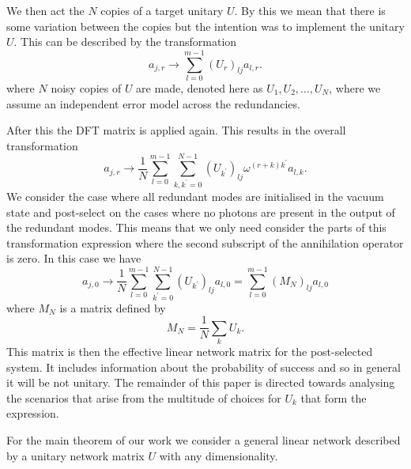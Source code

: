 \documentclass[aps,pra,twocolumn,superscriptaddress,numerical,floatfix]{revtex4-1}
\begin{document}
We then act the $N$ copies of a target unitary $U$.  By this we mean that there is some variation between the copies but the intention was to implement the unitary $U$.  This can be described by the transformation
\begin{equation}
	a_{j,r} \rightarrow \sum_{l=0}^{m-1} (U_r)_{lj} a_{l,r}.
\end{equation}
where $N$ noisy copies of $U$ are made, denoted here as $U_1, U_2, \ldots, U_N$, where we assume an independent error model across the redundancies. 

After this the DFT matrix is applied again.  This results in the overall transformation
\begin{equation}
	a_{j,r} \rightarrow \frac{1}{N} 
	\sum_{l=0}^{m-1} \sum_{k,k^\prime=0}^{N-1}
	(U_{k^\prime})_{lj} \omega^{(r+k)k^\prime} a_{l,k}.
\end{equation}
We consider the case where all redundant modes are initialised in the vacuum state and post-select on the cases where no photons are present in the output of the redundant modes.  This means that we only need consider the parts of this transformation expression where the second subscript of the annihilation operator is zero.  In this case we have
\begin{equation}
	\label{sum_transformation}
	a_{j,0} \rightarrow \frac{1}{N}\sum_{l=0}^{m-1} \sum_{k^\prime=0}^{N-1}
	(U_{k^\prime})_{lj} a_{l,0} = \sum_{l=0}^{m-1} (M_N)_{lj} a_{l,0}
\end{equation}
where $M_N$ is a matrix defined by
\begin{equation}
	M_N = \frac{1}{N} \sum_k U_k.
\end{equation}
This matrix is then the effective linear network matrix for the post-selected system.  It includes information about the probability of success and so in general it will be not unitary.  The remainder of this paper is directed towards analysing the scenarios that arise from the multitude of choices for $U_k$ that form the expression.

For the main theorem of our work we consider a general linear network described by a unitary network matrix $U$ with any dimensionality. 

\end{document}
